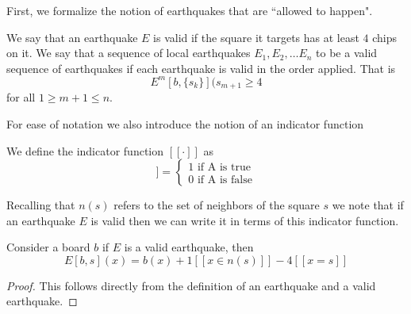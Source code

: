 \documentclass[runningheads,a4paper]{llncs}
\begin{document}
First, we formalize the notion of earthquakes that are ``allowed to happen".

\begin{definition}
We say that an earthquake $E$ is valid if the square it targets has at least $4$ chips on it. 
We say that a sequence of local earthquakes $E_1, E_2, \ldots E_n$ to be a valid sequence of earthquakes if each earthquake is valid in the order applied. That is 
\begin{equation*}
E^{m}[b, \{s_k\}](s_{m+1}  \geq 4
\end{equation*}
for all $1\geq m+1 \leq n$.
\end{definition}


For ease of notation we also introduce the notion of an indicator function
\begin{definition}
We define the indicator function $[[\cdot]]$ as 
\begin{equation*}
[[A]] = \begin{cases} 1 \text{ if A is true} \\ 0 \text{ if A is false} \end{cases}
\end{equation*}
\end{definition}

Recalling that $n(s)$ refers to the set of neighbors of the square $s$ we note that if an earthquake $E$ is valid then we can write it in terms of this indicator function.
\begin{lemma} 
\label{earthquakeredefine}
Consider a board $b$ if $E$ is a valid earthquake, then 
\begin{equation*}
E[b, s](x) = b(x) + 1[[ x \in n(s)]] - 4[[x =s]]
\end{equation*}
\end{lemma}
\begin{proof}
This follows directly from the definition of an earthquake and a valid earthquake. 
\end{proof}
\end{document}
